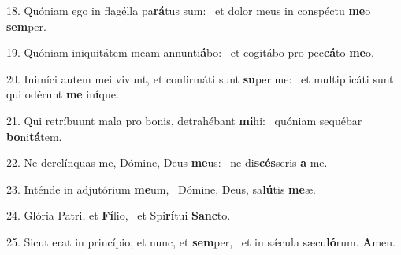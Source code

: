 18. Quóniam ego in flagélla pa\textbf{rá}tus sum: \ast\  et dolor meus in conspéctu \textbf{me}o \textbf{sem}per.\

19. Quóniam iniquitátem meam annunti\textbf{á}bo: \ast\  et cogitábo pro pec\textbf{cá}to \textbf{me}o.\

20. Inimíci autem mei vivunt, et confirmáti sunt \textbf{su}per me: \ast\  et multiplicáti sunt qui odérunt \textbf{me} in\textbf{í}que.\

21. Qui retríbuunt mala pro bonis, detrahébant \textbf{mi}hi: \ast\  quóniam sequébar \textbf{bo}ni\textbf{tá}tem.\

22. Ne derelínquas me, Dómine, Deus \textbf{me}us: \ast\  ne di\textbf{scés}seris \textbf{a} me.\

23. Inténde in adjutórium \textbf{me}um, \ast\  Dómine, Deus, sa\textbf{lú}tis \textbf{me}æ.\

24. Glória Patri, et \textbf{Fí}lio, \ast\  et Spi\textbf{rí}tui \textbf{Sanc}to.\

25. Sicut erat in princípio, et nunc, et \textbf{sem}per, \ast\  et in sǽcula sæcu\textbf{ló}rum. \textbf{A}men.\

